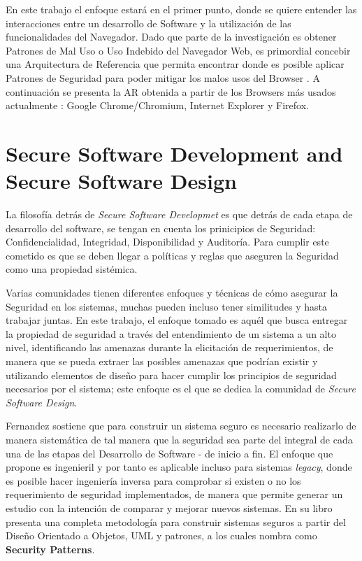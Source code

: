 En este trabajo el enfoque estará en el primer punto, donde se quiere entender las interacciones entre un desarrollo de Software y la utilización de las funcionalidades del Navegador. Dado que parte de la investigación es obtener Patrones de Mal Uso o Uso Indebido del Navegador Web, es primordial concebir una Arquitectura de Referencia que permita encontrar donde es posible aplicar Patrones de Seguridad para poder mitigar los malos usos del Browser \cite{Submitted2014}. A continuación se presenta la AR obtenida a partir de los Browsers más usados actualmente \cite{statBrow}: Google Chrome/Chromium, Internet Explorer y Firefox.

\section{Secure Software Development and Secure Software Design}
\label{chap2:SSD}

La filosofía detrás de \textit{Secure Software Developmet} es que detrás de cada etapa de desarrollo del software, se tengan en cuenta los prinicipios de Seguridad: Confidencialidad, Integridad, Disponibilidad y Auditoría. Para cumplir este cometido es que se deben llegar a políticas y reglas que aseguren la Seguridad como una propiedad sistémica.

Varias comunidades tienen diferentes enfoques y técnicas de cómo asegurar la Seguridad en los sistemas, muchas pueden incluso tener similitudes y hasta trabajar juntas. En este trabajo, el enfoque tomado es aquél que busca entregar la propiedad de seguridad a través del entendimiento de un sistema a un alto nivel, identificando las amenazas durante la elicitación de requerimientos, de manera que se pueda extraer las posibles amenazas que podrían existir y utilizando elementos de diseño para hacer cumplir los principios de seguridad necesarios por el sistema; este enfoque es el que se dedica la comunidad de \textit{Secure Software Design}. 

Fernandez \cite{fernandez2013security} sostiene que para construir un sistema seguro es necesario realizarlo de manera sistemática de tal manera que la seguridad sea parte del integral de cada una de las etapas del Desarrollo de Software - de inicio a fin. El enfoque que propone es ingenieril y por tanto es aplicable incluso para sistemas \textit{legacy}, donde es posible hacer ingeniería inversa para comprobar si existen o no los requerimiento de seguridad implementados, de manera que permite generar un estudio con la intención de comparar y mejorar nuevos sistemas. En su libro \cite{fernandez2013security} presenta una completa metodología para construir sistemas seguros a partir del Diseño Orientado a Objetos, UML y patrones, a los cuales nombra como \textbf{Security Patterns}.

